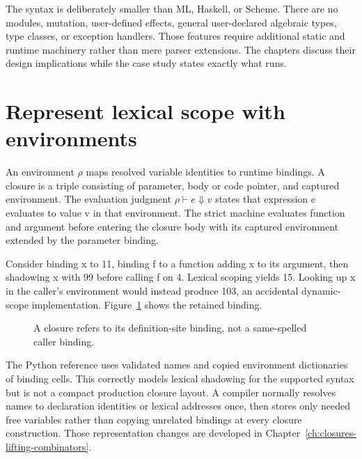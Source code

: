 The syntax is deliberately smaller than ML, Haskell, or Scheme.
There are no modules, mutation, user-defined effects, general user-declared algebraic types, type classes, or exception handlers.
Those features require additional static and runtime machinery rather than mere parser extensions.
The chapters discuss their design implications while the case study states exactly what runs.

\section{Represent lexical scope with environments}
\label{sec:ch89-environment}
An environment $\rho$ maps resolved variable identities to runtime bindings.
A closure is a triple consisting of parameter, body or code pointer, and captured environment.
The evaluation judgment $\rho\vdash e\Downarrow v$ states that expression e evaluates to value v in that environment.
The strict machine evaluates function and argument before entering the closure body with its captured environment extended by the parameter binding.

Consider binding x to 11, binding f to a function adding x to its argument, then shadowing x with 99 before calling f on 4.
Lexical scoping yields 15.
Looking up x in the caller's environment would instead produce 103, an accidental dynamic-scope implementation.
Figure~\ref{fig:ch89-closure} shows the retained binding.

\begin{figure}[htbp]
\centering
{}
\caption{A closure refers to its definition-site binding, not a same-spelled caller binding.}
\label{fig:ch89-closure}
\end{figure}

The Python reference uses validated names and copied environment dictionaries of binding cells.
This correctly models lexical shadowing for the supported syntax but is not a compact production closure layout.
A compiler normally resolves names to declaration identities or lexical addresses once, then stores only needed free variables rather than copying unrelated bindings at every closure construction.
Those representation changes are developed in Chapter~\ref{ch:closures-lifting-combinators}.

